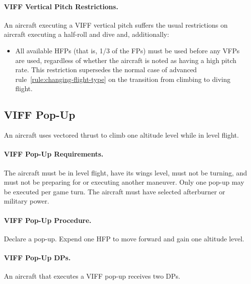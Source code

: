 \begin{advancedrules}
{\paragraph{VIFF Vertical Pitch Restrictions.} An aircraft executing a VIFF vertical pitch suffers the usual restrictions on aircraft executing a half-roll and dive and, additionally:

\begin{itemize}

    \item All available HFPs (that is, 1/3 of the FPs) must be used before any VFPs are used, regardless of whether the aircraft is noted as having a high pitch rate. This restriction supersedes the normal case of advanced rule~\ref{rule:changing-flight-type} on the transition from climbing to diving flight.
    
\end{itemize}

\subsection{VIFF Pop-Up}

An aircraft uses vectored thrust to climb one altitude level while in level flight.

\paragraph{VIFF Pop-Up Requirements.} The aircraft must be in level flight, have its wings level, must not be turning, and must not be preparing for or executing another maneuver. Only one pop-up may be executed per game turn. The aircraft must have selected afterburner or military power.

\paragraph{VIFF Pop-Up Procedure.} Declare a pop-up. Expend one HFP to move forward and gain one altitude level.

\paragraph{VIFF Pop-Up DPs.} An aircraft that executes a VIFF pop-up receives two DPs.

}

\end{advancedrules}
